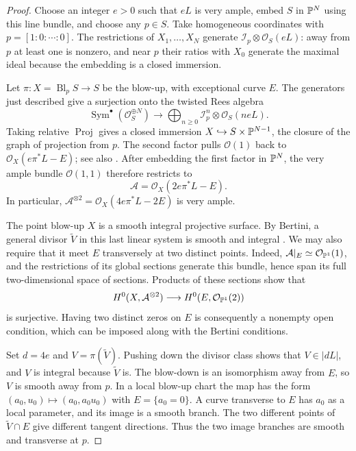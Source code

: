 \begin{proof}
Choose an integer $e>0$ such that $eL$ is very ample, embed $S$ in
$\mathbb P^N$ using this line bundle, and choose any $p\in S$.  Take homogeneous
coordinates with $p=[1:0:\cdots:0]$.  The restrictions of $X_1,\ldots,X_N$
generate $\mathcal I_p\otimes\mathcal O_S(eL)$: away from $p$ at least one
is nonzero, and near $p$ their ratios with $X_0$ generate the maximal ideal
because the embedding is a closed immersion.

Let $\pi:X=\operatorname{Bl}_pS\to S$ be the blow-up, with exceptional
curve $E$.  The generators just described give a surjection onto the
twisted Rees algebra
\[
 \operatorname{Sym}^{\bullet}(\mathcal O_S^{\oplus N})
 \longrightarrow
 \bigoplus_{n\ge0}\mathcal I_p^n\otimes\mathcal O_S(neL).
\]
Taking relative $\operatorname{Proj}$ gives a closed immersion
$X\hookrightarrow S\times\mathbb P^{N-1}$, the closure of the graph of projection from $p$.
The second factor pulls $\mathcal O(1)$ back to
$\mathcal O_X(e\pi^*L-E)$; see also \cite[Tag 01OF]{Stacks}.
After embedding the first factor in $\mathbb P^N$, the very ample bundle
$\mathcal O(1,1)$ therefore restricts to
\[
 \mathcal A=\mathcal O_X(2e\pi^*L-E).
\]
In particular, $\mathcal A^{\otimes2}=\mathcal O_X(4e\pi^*L-2E)$ is
very ample.

The point blow-up $X$ is a smooth integral projective surface.  By
Bertini, a general divisor $\widetilde V$ in this last linear system
is smooth and integral \cite[Tags 0FD6 and 0G4F]{Stacks}.  We may also
require that it meet $E$ transversely at two distinct points.  Indeed,
$\mathcal A|_E\simeq\mathcal O_{\mathbb P^1}(1)$, and the restrictions of its
global sections generate this bundle, hence span its full two-dimensional
space of sections.  Products of these sections show that
\[
 H^0(X,\mathcal A^{\otimes2})
 \longrightarrow H^0(E,\mathcal O_{\mathbb P^1}(2))
\]
is surjective.  Having two distinct zeros on $E$ is consequently a
nonempty open condition, which can be imposed along with the Bertini
conditions.

Set $d=4e$ and $V=\pi(\widetilde V)$.  Pushing down the divisor class
shows that $V\in|dL|$, and $V$ is integral because $\widetilde V$ is.
The blow-down is an isomorphism away from $E$, so $V$ is smooth away
from $p$.  In a local blow-up chart the map has the form
$(a_0,u_0)\mapsto(a_0,a_0u_0)$ with $E=\{a_0=0\}$.
A curve transverse to $E$ has $a_0$ as a local parameter, and its image
is a smooth branch.  The two different points of $\widetilde V\cap E$
give different tangent directions.  Thus the two image branches are
smooth and transverse at $p$.
\end{proof}

